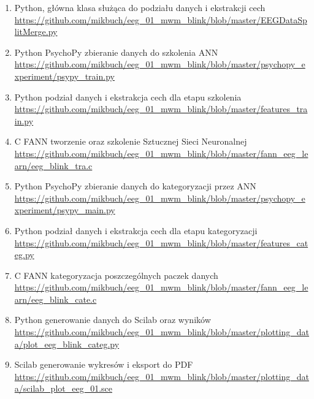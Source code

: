 \documentclass{article}
\begin{document}
        \begin{enumerate}
            \item{Python, główna klasa służąca do podziału danych i ekstrakcji cech} \\
                \url{https://github.com/mikbuch/eeg\_01\_mwm\_blink/blob/master/EEGDataSplitMerge.py}

            \item{Python PsychoPy zbieranie danych do szkolenia ANN} \\
                \url{https://github.com/mikbuch/eeg\_01\_mwm\_blink/blob/master/psychopy\_experiment/psypy\_train.py}

            \item{Python podział danych i ekstrakcja cech dla etapu szkolenia} \\
                \url{https://github.com/mikbuch/eeg\_01\_mwm\_blink/blob/master/features\_train.py}

            \item{C FANN tworzenie oraz szkolenie Sztucznej Sieci Neuronalnej} \\
                \url{https://github.com/mikbuch/eeg\_01\_mwm\_blink/blob/master/fann\_eeg\_learn/eeg\_blink\_tra.c}

            \item{Python PsychoPy zbieranie danych do kategoryzacji przez ANN} \\
                \url{https://github.com/mikbuch/eeg\_01\_mwm\_blink/blob/master/psychopy\_experiment/psypy\_main.py}

            \item{Python podział danych i ekstrakcja cech dla etapu kategoryzacji} \\
                \url{https://github.com/mikbuch/eeg\_01\_mwm\_blink/blob/master/features\_categ.py}

            \item{C FANN kategoryzacja poszczególnych paczek danych} \\
                \url{https://github.com/mikbuch/eeg\_01\_mwm\_blink/blob/master/fann\_eeg\_learn/eeg\_blink\_cate.c}

            \item{Python generowanie danych do Scilab oraz wyników} \\
                \url{https://github.com/mikbuch/eeg\_01\_mwm\_blink/blob/master/plotting\_data/plot\_eeg\_blink\_categ.py}

            \item{Scilab generowanie wykresów i eksport do PDF} \\
                \url{https://github.com/mikbuch/eeg\_01\_mwm\_blink/blob/master/plotting\_data/scilab\_plot\_eeg\_01.sce}


\end{enumerate}
\end{document}
